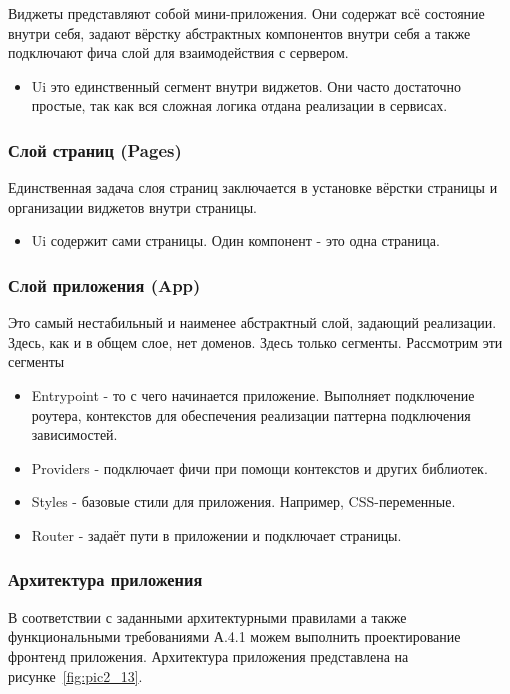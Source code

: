 \documentclass[14pt]{extarticle}
\begin{document}
Виджеты представляют собой мини-приложения. Они содержат всё состояние внутри себя, задают вёрстку абстрактных компонентов внутри себя
а также подключают фича слой для взаимодействия с сервером. 

\begin{itemize}
	\item Ui это единственный сегмент внутри виджетов. Они часто достаточно простые, так как вся сложная логика отдана реализации
	в сервисах.
\end{itemize}

\subsubsection{Слой страниц (Pages)}

Единственная задача слоя страниц заключается в установке вёрстки страницы и организации виджетов внутри страницы.

\begin{itemize}
	\item Ui содержит сами страницы. Один компонент - это одна страница.
\end{itemize}

\subsubsection{Слой приложения (App)}

Это самый нестабильный и наименее абстрактный слой, задающий реализации. Здесь, как и в общем слое, нет доменов. Здесь только сегменты.
Рассмотрим эти сегменты

\begin{itemize}
	\item Entrypoint - то с чего начинается приложение. Выполняет подключение роутера, контекстов для обеспечения реализации
	паттерна подключения зависимостей.
	\item Providers - подключает фичи при помощи контекстов и других библиотек.
	\item Styles - базовые стили для приложения. Например, CSS-переменные.
	\item Router - задаёт пути в приложении и подключает страницы.
\end{itemize}

\subsubsection{Архитектура приложения}

В соответствии с заданными архитектурными правилами а также функциональными требованиями А.4.1 можем выполнить проектирование фронтенд приложения.
Архитектура приложения представлена на рисунке~\ref{fig:pic2_13}.
\end{document}
